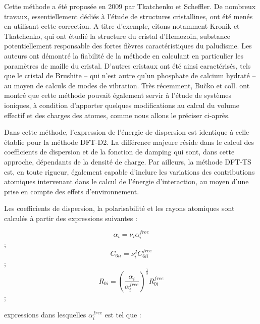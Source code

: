 {	Cette méthode a été proposée en 2009 par Tkatchenko et Scheffler\cite{tkatchenko2009accurate}. De nombreux travaux, essentiellement dédiés à l’étude de structures cristallines, ont été menés en utilisant cette correction. A titre d'exemple, citons notamment Kronik et Tkatchenko\cite{kronik2014understanding}, qui ont étudié la structure du cristal d'Hemozoin, substance potentiellement responsable des fortes fièvres caractéristiques du paludisme. Les auteurs ont démontré la fiabilité de la méthode en calculant en particulier les paramètres de maille du cristal. D’autres cristaux ont été ainsi caractérisés, tels que le cristal de Brushite -- qui n’est autre qu’un phosphate de calcium hydraté -- au moyen de calculs de modes de vibration. Très récemment, Bu\u{c}ko et coll. \cite{buvcko2014extending} ont montré que cette méthode pouvait également servir à l’étude de systèmes ioniques, à condition d’apporter quelques modifications au calcul du volume effectif et des charges des atomes, comme nous allons le préciser ci-après. 
	
	Dans cette méthode, l’expression de l'énergie de dispersion est identique à celle établie pour la méthode DFT-D2. La différence majeure réside dans le calcul des coefficients de dispersion et de la fonction de damping qui sont, dans cette approche, dépendants de la densité de charge. Par ailleurs, la méthode DFT-TS est, en toute rigueur, également capable d'inclure les variations des contributions atomiques intervenant dans le calcul de l’énergie d’interaction, au moyen d'une prise en compte des effets d'environnement. 
	
	Les coefficients de dispersion, la polarisabilité et les rayons atomiques sont calculés à partir des expressions suivantes :
	
	\begin{multicols}{3}
		\begin{equation} \alpha_{i} = \nu_{i} \alpha_{i}^{free} \end{equation};
		\begin{equation} C_{6ii} = \nu_{i}^{2} C_{6ii}^{free} \end{equation}; 
		\begin{equation} R_{0i} = \left(\frac{\alpha_{i}}{\alpha_{i}^{free}}\right)^{\frac{1}{3}} R_{0i}^{free} \end{equation}; 
	\end{multicols}
	
	\noindent expressions dans lesquelles $\alpha_{i}^{free}$ est tel que :
	
}
